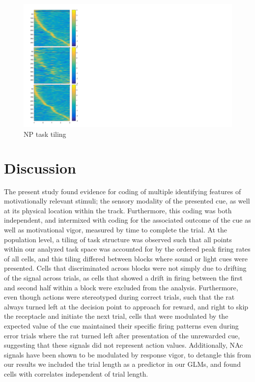 \documentclass[11pt]{article}
\begin{document}
\begin{figure}[h]
\centering
\includegraphics[width=\textwidth]{Fig 11 - NP task tiling.png}
\caption{NP task tiling}
\label{fig:NP_tiling}
\end{figure}

\section*{Discussion}

The present study found evidence for coding of multiple identifying features of motivationally relevant stimuli; the sensory modality of the presented cue, as well at its physical location within the track. Furthermore, this coding was both independent, and intermixed with coding for the associated outcome of the cue as well as motivational vigor, measured by time to complete the trial. At the population level, a tiling of task structure was observed such that all points within our analyzed task space was accounted for by the ordered peak firing rates of all cells, and this tiling differed between blocks where sound or light cues were presented.
Cells that discriminated across blocks were not simply due to drifting of the signal across trials, as cells that showed a drift in firing between the first and second half within a block were excluded from the analysis. Furthermore, even though actions were stereotyped during correct trials, such that the rat always turned left at the decision point to approach for reward, and right to skip the receptacle and initiate the next trial, cells that were modulated by the expected value of the cue maintained their specific firing patterns even during error trials where the rat turned left after presentation of the unrewarded cue, suggesting that these signals did not represent action values. Additionally, NAc signals have been shown to be modulated by response vigor, to detangle this from our results we included the trial length as a predictor in our GLMs, and found cells with correlates independent of trial length.
\end{document}
